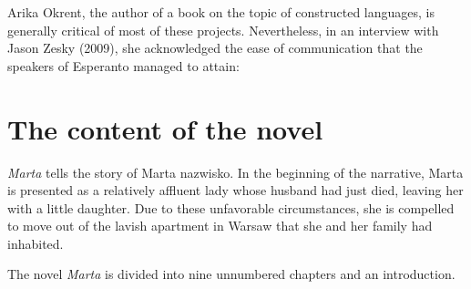 Arika Okrent, the author of a book on the topic of constructed languages, is generally critical of most of these projects.
Nevertheless, in an interview with Jason Zesky (2009), she acknowledged the ease of communication that the speakers of Esperanto managed to attain:


\section{The content of the novel}
\textit{Marta} tells the story of Marta {nazwisko}.
In the beginning of the narrative, Marta is presented as a relatively affluent lady whose husband had just died, leaving her with a little daughter. %
Due to these unfavorable circumstances, she is compelled to move out of the lavish apartment in Warsaw that she and her family had inhabited.

The novel \textit{Marta} is divided into nine unnumbered chapters and an introduction. 